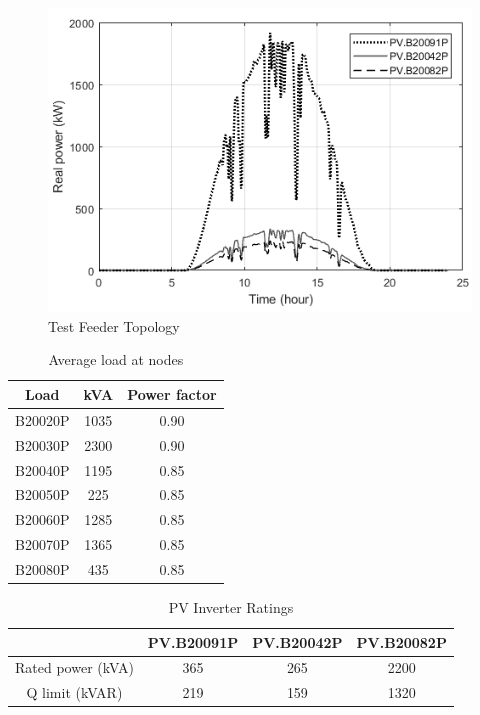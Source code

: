 \begin{figure}[!h]
\centering
\includegraphics[width=\linewidth]{figs/CVC/PV_DATA.png}
\caption{Test Feeder Topology}
\label{fig:pv_data}
\end{figure}

\begin{table}[!h]
\caption{Average load at nodes}
\label{tab:load_data}
\centering
\begin{tabular}{|c|c|c|}
\hline
Load & kVA & Power factor \\ \hline
B20020P & 1035 & 0.90 \\ \hline
B20030P & 2300 & 0.90 \\ \hline
B20040P & 1195 & 0.85 \\ \hline
B20050P & 225 & 0.85 \\ \hline
B20060P & 1285 & 0.85 \\ \hline
B20070P & 1365 & 0.85 \\ \hline
B20080P & 435 & 0.85 \\ \hline
\end{tabular}
\end{table}


\begin{table}[!h]
\centering
\caption{PV Inverter Ratings}
\label{tab:Inv_rate}
\begin{tabular}{c|c|c|c|}
\cline{2-4}
 & PV.B20091P & PV.B20042P & PV.B20082P \\ \hline
\multicolumn{1}{|c|}{Rated power (kVA)} & 365 & 265 & 2200 \\ \hline
\multicolumn{1}{|c|}{Q limit (kVAR)} & 219 & 159 & 1320 \\ \hline
\end{tabular}
\end{table}